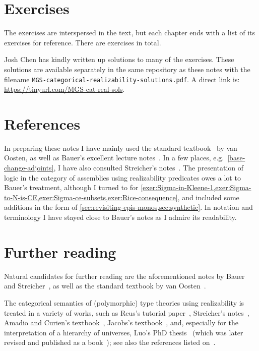 \section{Exercises}

The exercises are interspersed in the text, but each chapter ends with a list of
its exercises for reference.
%
There are  exercises in total.

Josh Chen has kindly written up solutions to many of the exercises. These
solutions are available separately in the same repository as these notes with
the filename \verb|MGS-categorical-realizability-solutions.pdf|. A direct link
is:
\url{https://tinyurl.com/MGS-cat-real-sols}.

\section{References}

In preparing these notes I have mainly used the standard
textbook~\cite{vanOosten2008} by van Oosten, as well as Bauer's excellent
lecture notes~\cite{Bauer2023}.
%
In a few places, e.g.\ \cref{base-change-adjoints}, I have also consulted
Streicher's notes~\cite{Streicher2018}.
%
The presentation of logic in the category of assemblies using realizability
predicates owes a lot to Bauer's treatment, although I turned to
\cite[Section~3.2.7]{vanOosten2008} for
\cref{exer:Sigma-in-Kleene-1,exer:Sigma-to-N-is-CE,exer:Sigma-ce-subsets,exer:Rice-consequence},
and included some additions in the form of
\cref{sec:revisiting-epis-monos,sec:synthetic}.
%
In notation and terminology I have stayed close to Bauer's notes as I admire its
readability.

\section{Further reading}\label{sec:further-reading}

Natural candidates for further reading are the aforementioned
notes by Bauer~\cite{Bauer2023} and Streicher~\cite{Streicher2018}, as well as
the standard textbook by van Oosten~\cite{vanOosten2008}.

The categorical semantics of (polymorphic) type theories using realizability is
treated in a variety of works, such as Reus's tutorial paper~\cite{Reus1999},
Streicher's notes~\cite{Streicher2018}, Amadio and Curien's
textbook~\cite{AmadioCurien1998}, Jacobs's textbook~\cite{Jacobs1999}, and,
especially for the interpretation of a hierarchy of universes, Luo's PhD
thesis~\cite[Chapter~7]{Luo1990} (which was later revised and published as a
book~\cite{Luo1994}); see also the references listed
on~\cite[p.~193]{vanOosten2008}.

